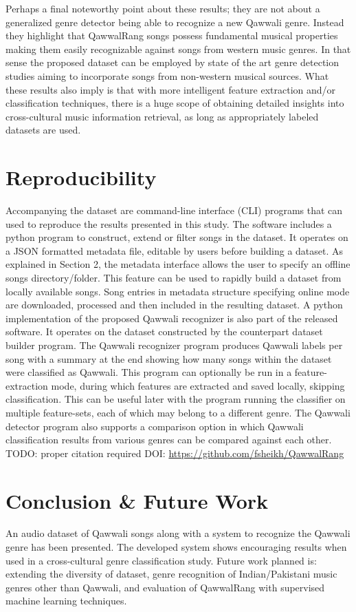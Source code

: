 \documentclass{article}
\begin{document}
Perhaps a final noteworthy point about these results; they are not about a generalized genre detector being able to recognize a new Qawwali genre. Instead they highlight that QawwalRang songs possess fundamental musical properties making them easily recognizable against songs from western music genres. In that sense the proposed dataset can be employed by state of the art genre detection studies aiming to incorporate songs from non-western musical sources. What these results also imply is that with more intelligent feature extraction and/or classification techniques, there is a huge scope of obtaining detailed insights into cross-cultural music information retrieval, as long as appropriately labeled datasets are used.

\section{Reproducibility}
Accompanying the dataset are command-line interface (CLI) programs that can used to reproduce the results presented in this study. The software includes a python program to construct, extend or filter songs in the dataset. It operates on a JSON \citep{json} formatted metadata file, editable by users before building a dataset. As explained in Section 2, the metadata interface allows the user to specify an offline songs directory/folder. This feature can be used to rapidly build a dataset from locally available songs. Song entries in metadata structure specifying online mode are downloaded, processed and then included in the resulting dataset. A python implementation of the proposed Qawwali recognizer is also part of the released software. It operates on the dataset constructed by the counterpart dataset builder program. The Qawwali recognizer program produces Qawwali labels per song with a summary at the end showing how many songs within the dataset were classified as Qawwali. This program can optionally be run in a feature-extraction mode, during which features are extracted and saved locally, skipping classification. This can be useful later with the program running the classifier on multiple feature-sets,  each of which may belong to a different genre. The Qawwali detector program also supports a comparison option in which Qawwali classification results from various genres can be compared against each other. TODO: proper citation required DOI: \url{https://github.com/fsheikh/QawwalRang}
\section{Conclusion \& Future Work}
An audio dataset of Qawwali songs along with a system to recognize the Qawwali genre has been presented. The developed system shows encouraging results when used in a cross-cultural genre classification study. Future work planned is: extending the diversity of dataset, genre recognition of Indian/Pakistani music genres other than Qawwali, and evaluation of QawwalRang with supervised machine learning techniques.
\end{document}
